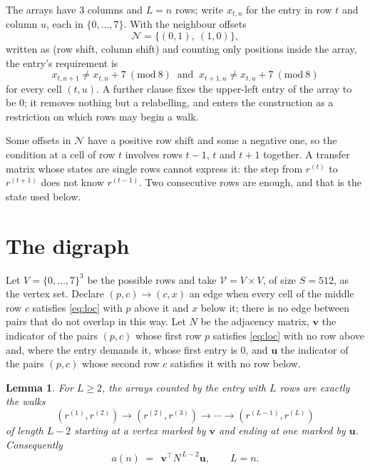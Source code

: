 \documentclass[11pt,a4paper]{article}
\theoremstyle{plain}
\newtheorem{lemma}[theorem]{Lemma}
\theoremstyle{definition}
\begin{document}
The arrays have $3$ columns and $L=n$ rows; write $x_{t,u}$ for the entry in
row $t$ and column $u$, each in $\{0,\dots,7\}$. With the neighbour offsets
\[
\mathcal N=\{(0,1),\ (1,0)\},
\]
written as (row shift, column shift) and counting only positions inside the array, the
entry's requirement is
\begin{equation}\label{eq:loc}
x_{t,u+1}\ne x_{t,u}+7\ (\mathrm{mod}\ 8)\ \text{ and }\ x_{t+1,u}\ne x_{t,u}+7\ (\mathrm{mod}\ 8)
\end{equation}
for every cell $(t,u)$. A further clause fixes the upper-left entry of the array to be $0$; it removes nothing but a relabelling, and enters the construction as a restriction on which rows may begin a walk.

Some offsets in $\mathcal N$ have a positive row shift and some a negative one, so the
condition at a cell of row $t$ involves rows $t-1$, $t$ and $t+1$ together. A transfer
matrix whose states are single rows cannot express it: the step from $r^{(t)}$ to
$r^{(t+1)}$ does not know $r^{(t-1)}$. Two consecutive rows are enough, and that is
the state used below.

\section{The digraph}

Let $V=\{0,\dots,7\}^{3}$ be the possible rows and take
$\mathcal V=V\times V$, of size $S=512$, as the vertex set. Declare $(p,c)\to(c,x)$ an edge
when every cell of the middle row $c$ satisfies \eqref{eq:loc} with $p$ above it and $x$
below it; there is no edge between pairs that do not overlap in this way. Let $N$ be the
adjacency matrix, $\mathbf{v}$ the indicator of the pairs $(p,c)$ whose first row $p$
satisfies \eqref{eq:loc} with no row above and, where the entry demands it, whose first entry is $0$, and $\mathbf{u}$ the indicator of
the pairs $(p,c)$ whose second row $c$ satisfies it with no row below.

\begin{lemma}\label{lem:walk}
For $L\ge2$, the arrays counted by the entry with $L$ rows are exactly the walks
\[
(r^{(1)},r^{(2)})\to(r^{(2)},r^{(3)})\to\cdots\to(r^{(L-1)},r^{(L)})
\]
of length $L-2$ starting at a vertex marked by $\mathbf{v}$ and ending at one marked by
$\mathbf{u}$. Consequently
\[
a(n)\;=\;\,\mathbf{v}^{\!\top}N^{\,L-2}\mathbf{u},\qquad L=n .
\]
\end{lemma}
\end{document}
